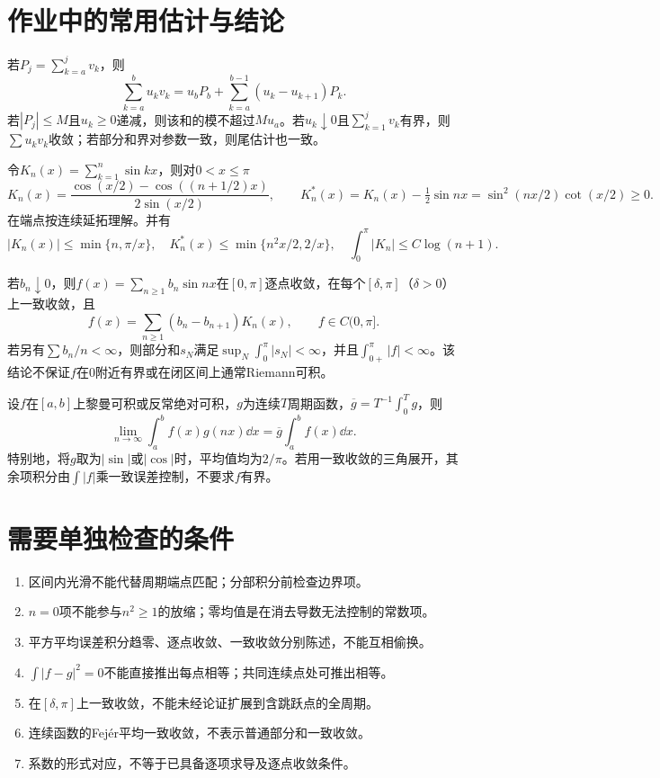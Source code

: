 \section{作业中的常用估计与结论}
\begin{result}[Abel求和与Dirichlet判别法]\label{st:Abel}
若$P_j=\sum_{k=a}^jv_k$，则
\[
 \sum_{k=a}^bu_kv_k=u_bP_b+\sum_{k=a}^{b-1}(u_k-u_{k+1})P_k.
\]
若$|P_j|\le M$且$u_k\ge0$递减，则该和的模不超过$Mu_a$。若$u_k\downarrow0$且$\sum_{k=1}^jv_k$有界，则$\sum u_kv_k$收敛；若部分和界对参数一致，则尾估计也一致。
\end{result}
\begin{result}[正弦和及非负辅助核]\label{st:Kstar}
令$K_n(x)=\sum_{k=1}^n\sin kx$，则对$0<x\le\pi$
\[
 K_n(x)=\frac{\cos(x/2)-\cos((n+1/2)x)}{2\sin(x/2)},\qquad
 K_n^*(x)=K_n(x)-\tfrac12\sin nx=\sin^2(nx/2)\cot(x/2)\ge0.
\]
在端点按连续延拓理解。并有
\[
 |K_n(x)|\le\min\{n,\pi/x\},\quad
 K_n^*(x)\le\min\{n^2x/2,2/x\},\quad
 \int_0^\pi|K_n|\le C\log(n+1).
\]
\end{result}
\begin{result}[单调系数正弦级数]\label{st:sineseries}
若$b_n\downarrow0$，则$f(x)=\sum_{n\ge1}b_n\sin nx$在$[0,\pi]$逐点收敛，在每个$[\delta,\pi]$（$\delta>0$）上一致收敛，且
\[
 f(x)=\sum_{n\ge1}(b_n-b_{n+1})K_n(x),\qquad f\in C(0,\pi].
\]
若另有$\sum b_n/n<\infty$，则部分和$s_N$满足$\sup_N\int_0^\pi|s_N|<\infty$，并且$\int_{0+}^{\pi}|f|<\infty$。该结论不保证$f$在$0$附近有界或在闭区间上通常Riemann可积。
\end{result}
\begin{result}[周期振荡平均]\label{st:average}
设$f$在$[a,b]$上黎曼可积或反常绝对可积，$g$为连续$T$周期函数，$\overline g=T^{-1}\int_0^Tg$，则
\[
 \lim_{n\to\infty}\int_a^bf(x)g(nx)\dd x=\overline g\int_a^bf(x)\dd x.
\]
特别地，将$g$取为$|\sin|$或$|\cos|$时，平均值均为$2/\pi$。若用一致收敛的三角展开，其余项积分由$\int|f|$乘一致误差控制，不要求$f$有界。
\end{result}

\section{需要单独检查的条件}
\begin{enumerate}
\item 区间内光滑不能代替周期端点匹配；分部积分前检查边界项。
\item $n=0$项不能参与$n^2\ge1$的放缩；零均值是在消去导数无法控制的常数项。
\item 平方平均误差积分趋零、逐点收敛、一致收敛分别陈述，不能互相偷换。
\item $\int|f-g|^2=0$不能直接推出每点相等；共同连续点处可推出相等。
\item 在$[\delta,\pi]$上一致收敛，不能未经论证扩展到含跳跃点的全周期。
\item 连续函数的Fej\'er平均一致收敛，不表示普通部分和一致收敛。
\item 系数的形式对应，不等于已具备逐项求导及逐点收敛条件。
\end{enumerate}

